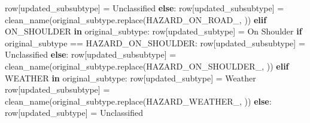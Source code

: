 \documentclass[
  letterpaper,
  DIV=11,
  numbers=noendperiod]{scrartcl}
\newenvironment{Shaded}{\begin{snugshade}}{\end{snugshade}}
\newcommand{\ControlFlowTok}[1]{\textcolor[rgb]{0.00,0.23,0.31}{\textbf{#1}}}
\newcommand{\KeywordTok}[1]{\textcolor[rgb]{0.00,0.23,0.31}{\textbf{#1}}}
\newcommand{\NormalTok}[1]{\textcolor[rgb]{0.00,0.23,0.31}{#1}}
\newcommand{\OperatorTok}[1]{\textcolor[rgb]{0.37,0.37,0.37}{#1}}
\newcommand{\StringTok}[1]{\textcolor[rgb]{0.13,0.47,0.30}{#1}}
\begin{document}
\begin{Shaded}
\begin{Highlighting}[]
\NormalTok{                row[}\StringTok{\textquotesingle{}updated\_subsubtype\textquotesingle{}}\NormalTok{] }\OperatorTok{=} \StringTok{\textquotesingle{}Unclassified\textquotesingle{}}
            \ControlFlowTok{else}\NormalTok{:}
\NormalTok{                row[}\StringTok{\textquotesingle{}updated\_subsubtype\textquotesingle{}}\NormalTok{] }\OperatorTok{=}\NormalTok{ clean\_name(original\_subtype.replace(}\StringTok{\textquotesingle{}HAZARD\_ON\_ROAD\_\textquotesingle{}}\NormalTok{, }\StringTok{\textquotesingle{}\textquotesingle{}}\NormalTok{))}
        \ControlFlowTok{elif} \StringTok{\textquotesingle{}ON\_SHOULDER\textquotesingle{}} \KeywordTok{in}\NormalTok{ original\_subtype:}
\NormalTok{            row[}\StringTok{\textquotesingle{}updated\_subtype\textquotesingle{}}\NormalTok{] }\OperatorTok{=} \StringTok{\textquotesingle{}On Shoulder\textquotesingle{}}
            \ControlFlowTok{if}\NormalTok{ original\_subtype }\OperatorTok{==} \StringTok{\textquotesingle{}HAZARD\_ON\_SHOULDER\textquotesingle{}}\NormalTok{:}
\NormalTok{                row[}\StringTok{\textquotesingle{}updated\_subsubtype\textquotesingle{}}\NormalTok{] }\OperatorTok{=} \StringTok{\textquotesingle{}Unclassified\textquotesingle{}}
            \ControlFlowTok{else}\NormalTok{:}
\NormalTok{                row[}\StringTok{\textquotesingle{}updated\_subsubtype\textquotesingle{}}\NormalTok{] }\OperatorTok{=}\NormalTok{ clean\_name(original\_subtype.replace(}\StringTok{\textquotesingle{}HAZARD\_ON\_SHOULDER\_\textquotesingle{}}\NormalTok{, }\StringTok{\textquotesingle{}\textquotesingle{}}\NormalTok{))}
        \ControlFlowTok{elif} \StringTok{\textquotesingle{}WEATHER\textquotesingle{}} \KeywordTok{in}\NormalTok{ original\_subtype:}
\NormalTok{            row[}\StringTok{\textquotesingle{}updated\_subtype\textquotesingle{}}\NormalTok{] }\OperatorTok{=} \StringTok{\textquotesingle{}Weather\textquotesingle{}}
\NormalTok{            row[}\StringTok{\textquotesingle{}updated\_subsubtype\textquotesingle{}}\NormalTok{] }\OperatorTok{=}\NormalTok{ clean\_name(original\_subtype.replace(}\StringTok{\textquotesingle{}HAZARD\_WEATHER\_\textquotesingle{}}\NormalTok{, }\StringTok{\textquotesingle{}\textquotesingle{}}\NormalTok{))}
        \ControlFlowTok{else}\NormalTok{:}
\NormalTok{            row[}\StringTok{\textquotesingle{}updated\_subtype\textquotesingle{}}\NormalTok{] }\OperatorTok{=} \StringTok{\textquotesingle{}Unclassified\textquotesingle{}}


\end{Highlighting}
\end{Shaded}
\end{document}
